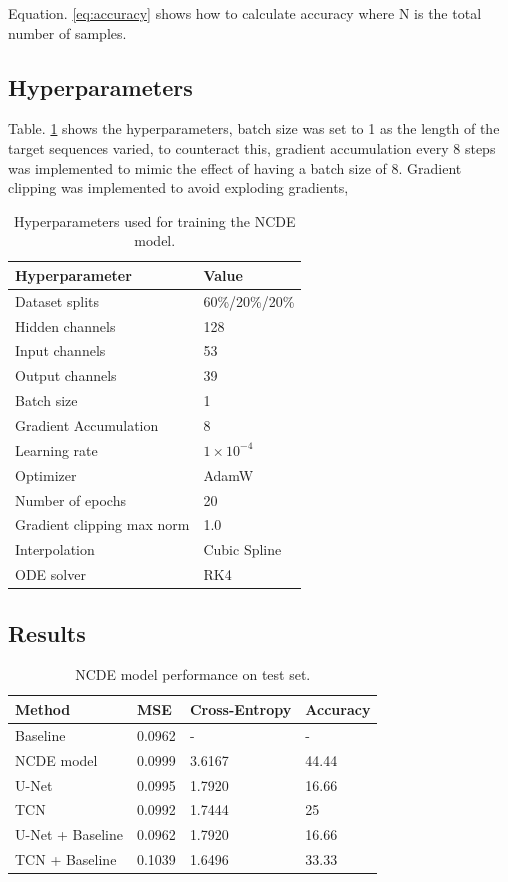 \documentclass{article}
\begin{document}
Equation. \ref{eq:accuracy} shows how to calculate accuracy where N is the total number of samples.

\subsection{Hyperparameters}
Table. \ref{tab:hyperparameters} shows the hyperparameters, batch size was set to 1 as the length of the target sequences varied, to counteract this, gradient accumulation every 8 steps was implemented to mimic the effect of having a batch size of 8. Gradient clipping was implemented to avoid exploding gradients,

\begin{table}[!t]
\centering
\begin{tabular}{l l}
\toprule
\textbf{Hyperparameter} & \textbf{Value} \\
\midrule
Dataset splits & 60\%/20\%/20\% \\
Hidden channels & 128 \\
Input channels & 53 \\
Output channels & 39 \\
Batch size & 1 \\
Gradient Accumulation & 8 \\
Learning rate & $1\times10^{-4}$ \\
Optimizer & AdamW \\
Number of epochs & 20 \\
Gradient clipping max norm & 1.0 \\
Interpolation & Cubic Spline \\
ODE solver & RK4\\
\bottomrule
\end{tabular}
\caption{Hyperparameters used for training the NCDE model.}
\label{tab:hyperparameters}
\end{table}

\subsection{Results}
\begin{table}[!t]
\centering
\begin{tabular}{p{2.8cm} p{1cm} p{1.2cm} p{1.4cm}}
\toprule
\textbf{Method} & \textbf{MSE} & \textbf{Cross-Entropy}& \textbf{Accuracy} \\
\midrule
Baseline & 0.0962 & - & - \\
NCDE model & 0.0999 & 3.6167 & 44.44 \\
U-Net & 0.0995 & 1.7920 & 16.66 \\
TCN & 0.0992 & 1.7444 & 25 \\
U-Net + Baseline & 0.0962 & 1.7920 & 16.66 \\
TCN + Baseline & 0.1039 & 1.6496 & 33.33 \\
\bottomrule
\end{tabular}
\caption{NCDE model performance on test set.}
\label{tab:result}
\end{table}
\end{document}
